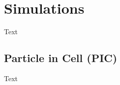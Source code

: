 %
%

\chapter{Simulations}
\label{Ch:Sim}

Text

\section{Particle in Cell (PIC)}
\label{Sim:PIC}

Text

